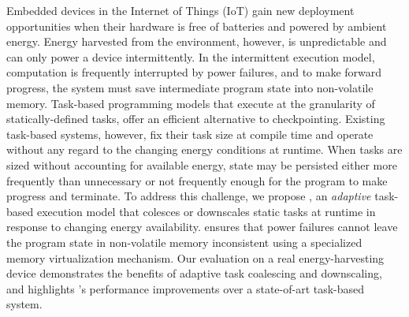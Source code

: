 Embedded devices in the Internet of Things (IoT) gain new deployment opportunities when their hardware is free of batteries and powered by ambient energy. Energy harvested from the environment, however, is unpredictable and can only power a device intermittently. In the intermittent execution model, computation is frequently interrupted by power failures, and to make forward progress, the system must save intermediate program state into non-volatile memory. Task-based programming models that execute at the granularity of statically-defined tasks, offer an efficient alternative to checkpointing. Existing task-based systems, however, fix their task size at compile time and operate without any regard to the changing energy conditions at runtime. When tasks are sized without accounting for available energy, state may be persisted either more frequently than unnecessary or not frequently enough for the program to make progress and terminate. To address this challenge, we propose \sys, an \emph{adaptive} task-based execution model that colesces or downscales static tasks at runtime in response to changing energy availability. \sys ensures that power failures cannot leave the program state in non-volatile memory inconsistent using a specialized memory virtualization mechanism. Our evaluation on a real energy-harvesting device demonstrates the benefits of adaptive task coalescing and downscaling, and highlights \sys's performance improvements over a state-of-art task-based system.